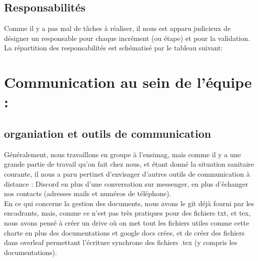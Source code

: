 \documentclass[12pt]{article}
\begin{document}
\subsection{Responsabilités}
Comme il y a pas mal de tâches à réaliser, il nous est apparu judicieux de désigner un responsable pour chaque incrément (ou étape) et pour la validation. 
La répartition des responsabilités est schématisé par le tableau suivant: 
\begin{center}
\end{center}

\section{\textbf{Communication au sein de l’équipe :}}
\subsection{organiation et outils de communication }
Généralement, nous travaillons en groupe à l'ensimag,
 mais comme il y a une grande partie de travail qu'on fait chez nous, et étant donné la situation sanitaire courante, il nous a paru pertinet d'envisager d'autres outils de communication à distance : Discord en plus d'une conversation sur messenger, en plus d'échanger nos contacts (adresses mails et numéros de téléphone). \\
 En ce qui concerne la gestion des documents, nous avons le git déjà fourni par les encadrants, mais, comme ce n'est pas très pratiques pour des fichiers txt, et tex, nous avons pensé à créer un drive où on met tout les fichiers utiles comme cette charte en plus des documentations et google docs crées, et de créer des fichiers dans overleaf permettant l'écriture synchrone des fichiers .tex (y compris les documentations). 
\end{document}
